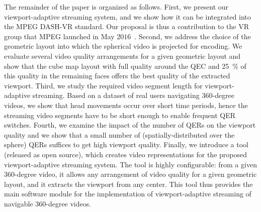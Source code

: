 The remainder of the paper is organized as follows. First, we
present our viewport-adaptive streaming
system, and
we show how it can be integrated into
the \ac{MPEG} \ac{DASH}-VR standard. Our proposal is thus a contribution
to the \ac{VR} group that \ac{MPEG} launched in May
$2016$~\cite{mpeg-vr}. Second, we address the choice of the geometric
layout into which the spherical video is projected for
encoding. We evaluate several video quality arrangements for a given
geometric layout and show that the cube map layout with full quality around the \ac{QEC} and \SI{25}{\percent} of this quality in the remaining faces offers the best quality of the extracted viewport.
Third, we study the required video segment length for
viewport-adaptive streaming. Based on a dataset of real users
navigating $360$-degree videos, we show that head movements occur over
short time periods, hence the streaming video segments have to be
short enough to enable frequent \ac{QER} switches. Fourth, we
examine the impact of the number of \acp{QER} on the viewport quality
and we show that a small number of (spatially-distributed over the sphere)
\acp{QER} suffices to get high viewport quality.
Finally, we introduce a tool (released as open source), which creates video representations for the proposed viewport-adaptive streaming system.
The tool is highly configurable: from a given
$360$-degree video, it allows any arrangement of video quality for a
given geometric layout, and it extracts the viewport from any \FoV{} center.
This tool thus provides the main software module
for the implementation of viewport-adaptive streaming of navigable
$360$-degree videos.

